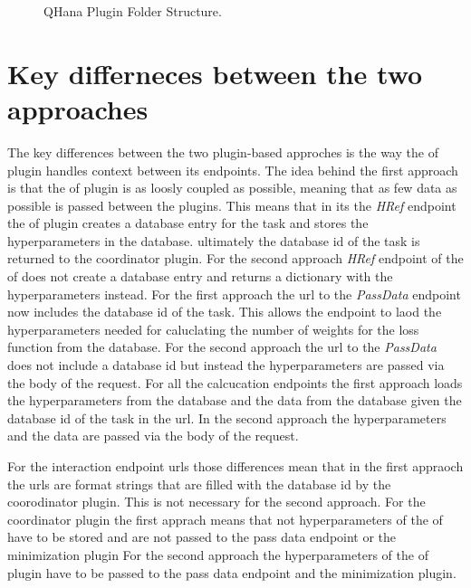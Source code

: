 \documentclass[
  a4paper,  %
  twoside,  %
  bibliography=totoc,
  headsepline,
  cleardoublepage=empty,
  parskip=half,
  draft=false
]{scrbook}
\begin{document}
\begin{figure}[h!]
  \caption{QHana Plugin Folder Structure.}
  \label{fig:folderStructure}
\end{figure}

\section{Key differneces between the two approaches}
\label{sec:keyDifferencesBetweenTheTwoApproaches}
The key differences between the two plugin-based approches is the way the \gls{of} plugin handles context between its endpoints.
The idea behind the first approach is that the \gls{of} plugin is as loosly coupled as possible, meaning that as few data as possible is passed between the plugins.
This means that in its the \emph{HRef} endpoint the \gls{of} plugin creates a database entry for the task and stores the hyperparameters in the database.
ultimately the database id of the task is returned to the coordinator plugin.
For the second approach \emph{HRef} endpoint of the \gls{of} does not create a database entry and returns a dictionary with the hyperparameters instead.
For the first approach the url to the \emph{PassData} endpoint now includes the database id of the task. This allows the endpoint to laod the hyperparameters needed for caluclating the number of weights for the loss function from the database.
For the second approach the url to the \emph{PassData} does not include a database id but instead the hyperparameters are passed via the body of the request.
For all the calcucation endpoints the first approach loads the hyperparameters from the database and the data from the database given the database id of the task in the url.
In the second approach the hyperparameters and the data are passed via the body of the request.

For the interaction endpoint urls those differences mean that in the first appraoch the urls are format strings that are filled with the database id by the coorodinator plugin.
This is not necessary for the second approach.
For the coordinator plugin the first apprach means that not hyperparameters of the \gls{of} have to be stored and are not passed to the pass data endpoint or the minimization plugin
For the second approach the hyperparameters of the \gls{of} plugin have to be passed to the pass data endpoint and the minimization plugin.
\end{document}
